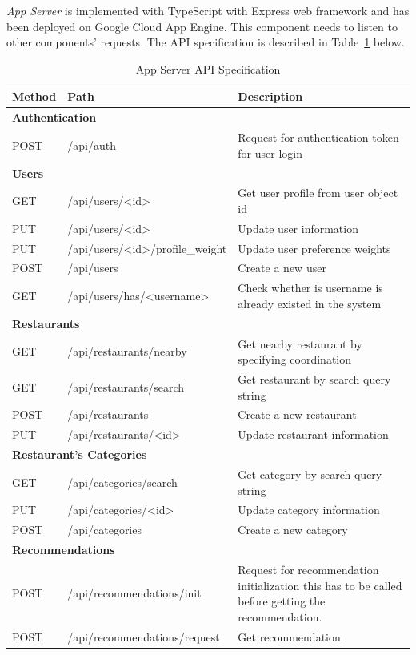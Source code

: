 \documentclass[12pt,oneside,openright,a4paper]{cpe-english-project}
\begin{document}
\textit{App Server} is implemented with TypeScript with Express web framework and has been deployed on Google Cloud App Engine. This component needs to listen to other components’ requests. The API specification is described in Table~\ref{tbl:4AppServerAPISpecification} below.

\begin{table}[H]
\caption{App Server API Specification}\label{tbl:4AppServerAPISpecification}
\begin{tabularx}{\textwidth}{l|l|X} \hline\hline
Method & Path & Description \\ \hline\hline
\multicolumn{3}{l}{\textbf{Authentication}} \\ \hline\hline
POST & /api/auth & Request for authentication token for user login\\ \hline\hline
\multicolumn{3}{l}{\textbf{Users}}\\ \hline\hline
GET & /api/users/<id> & Get user profile from user object id \\ \hline
PUT & /api/users/<id> & Update user information \\ \hline
PUT & /api/users/<id>/profile\_weight & Update user preference weights \\ \hline
POST & /api/users & Create a new user \\ \hline
GET & /api/users/has/<username> & Check whether is username is already existed in the system\\ \hline\hline
\multicolumn{3}{l}{\textbf{Restaurants}}\\ \hline\hline
GET & /api/restaurants/nearby & Get nearby restaurant by specifying coordination \\ \hline
GET & /api/restaurants/search & Get restaurant by search query string \\ \hline
POST & /api/restaurants & Create a new restaurant \\ \hline
PUT & /api/restaurants/<id> & Update restaurant information \\ \hline\hline
\multicolumn{3}{l}{\textbf{Restaurant’s Categories}}\\ \hline\hline
GET & /api/categories/search & Get category by search query string \\ \hline
PUT & /api/categories/<id> & Update category information \\ \hline
POST & /api/categories & Create a new category \\ \hline\hline
\multicolumn{3}{l}{\textbf{Recommendations}}\\ \hline\hline
POST & /api/recommendations/init & Request for recommendation initialization this has to be called before getting the recommendation. \\ \hline
POST & /api/recommendations/request & Get recommendation \\ \hline\hline
\end{tabularx}
\end{table}
\end{document}
